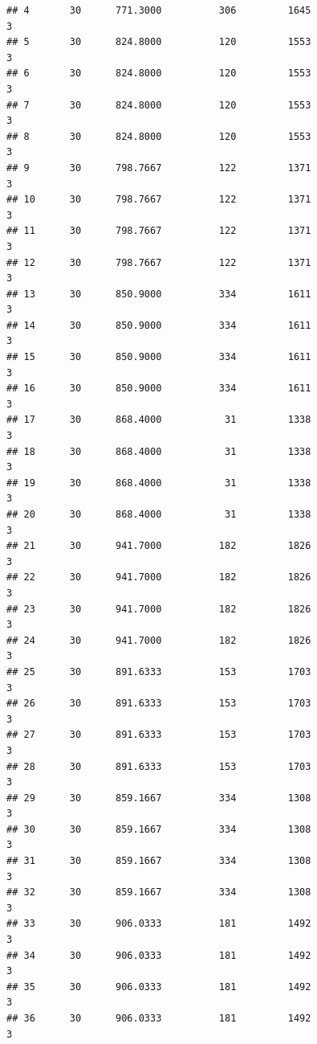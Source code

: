 \documentclass[
]{article}
\begin{document}
\begin{verbatim}
## 4       30      771.3000          306         1645                        3
## 5       30      824.8000          120         1553                        3
## 6       30      824.8000          120         1553                        3
## 7       30      824.8000          120         1553                        3
## 8       30      824.8000          120         1553                        3
## 9       30      798.7667          122         1371                        3
## 10      30      798.7667          122         1371                        3
## 11      30      798.7667          122         1371                        3
## 12      30      798.7667          122         1371                        3
## 13      30      850.9000          334         1611                        3
## 14      30      850.9000          334         1611                        3
## 15      30      850.9000          334         1611                        3
## 16      30      850.9000          334         1611                        3
## 17      30      868.4000           31         1338                        3
## 18      30      868.4000           31         1338                        3
## 19      30      868.4000           31         1338                        3
## 20      30      868.4000           31         1338                        3
## 21      30      941.7000          182         1826                        3
## 22      30      941.7000          182         1826                        3
## 23      30      941.7000          182         1826                        3
## 24      30      941.7000          182         1826                        3
## 25      30      891.6333          153         1703                        3
## 26      30      891.6333          153         1703                        3
## 27      30      891.6333          153         1703                        3
## 28      30      891.6333          153         1703                        3
## 29      30      859.1667          334         1308                        3
## 30      30      859.1667          334         1308                        3
## 31      30      859.1667          334         1308                        3
## 32      30      859.1667          334         1308                        3
## 33      30      906.0333          181         1492                        3
## 34      30      906.0333          181         1492                        3
## 35      30      906.0333          181         1492                        3
## 36      30      906.0333          181         1492                        3

\end{verbatim}
\end{document}
